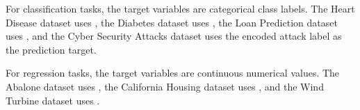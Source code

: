 \begin{table}[H]
    \centering
    \caption{Datasets Used in the Experiment}
    \label{tab:datasets_experiment}
    \small
\end{table}

For classification tasks, the target variables are categorical class labels. The Heart Disease dataset uses , the Diabetes dataset uses , the Loan Prediction dataset uses , and the Cyber Security Attacks dataset uses the encoded attack label as the prediction target.

For regression tasks, the target variables are continuous numerical values. The Abalone dataset uses , the California Housing dataset uses , and the Wind Turbine dataset uses .

